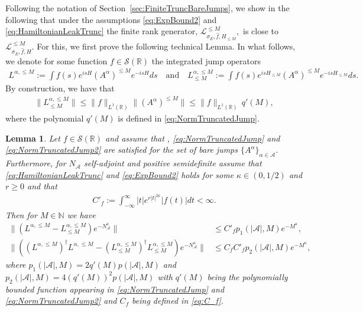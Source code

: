 \documentclass[11pt]{amsart}
\newcommand{\1}{\mathbbm{1}}
\newcommand{\N}{\mathbb{N}}
\newcommand{\cL}{\mathcal{L}}
\newcommand{\NA}{N_{\mathcal{A}}}
\newcommand{\cA}{\mathcal{A}}
\newcommand{\bin}[1]{}
\theoremstyle{plain}
\newtheorem{lemma}[theorem]{Lemma}
\theoremstyle{definition}
\theoremstyle{remark}
\numberwithin{equation}{section}
\begin{document}
\bin{In Section~\ref{sec:FiniteTruncBareJumps} we introduced the finite-dimensional truncations $a^{\le M}_i$ and $\left(a_i^{\le M}\right)^\dagger$ of the bare jumps $a$ and $a^\dagger$ and the generator $\mathcal{L}^{\le M}_{\sigma_E,\widehat{f},H}$ where we replaced the bare jumps in terms of the usual annihilation and creation operators in $\cL_{\sigma_E}$ with their finite-dimensional truncations.} 

Following the notation of Section~\ref{sec:FiniteTruncBareJumps}, we show in the following that under the assumptions \eqref{eq:ExpBound2} and \eqref{eq:HamiltonianLeakTrunc} the finite rank generator, $\mathcal{L}^{\le M}_{\sigma_E,\widehat{f},H_{\le M}},$ is close to $\mathcal{L}^{\le M}_{\sigma_E,\widehat{f},H}.$
For this, we first prove the following technical Lemma. In what follows, we denote for some function $f\in\mathcal{S}(\mathbb{R})$ the integrated jump operators 
\begin{align}
\label{eq:TruncatedL}
L^{\alpha,\le M}:=\int f(s)e^{isH}(A^{\alpha})^{\le M}e^{-isH}ds\quad\text{and}\quad
L^{\alpha,\le M}_{\le M}:=\int f(s)e^{isH_{\le M}}(A^{\alpha})^{\le M} e^{-isH_{\le M}}ds.
\end{align}
By construction, we have that
\begin{align}\label{eqLalphaMMbound}
\|L^{\alpha,\le M}_{\le M}\|\le \|f\|_{L^1(\mathbb{R})}\|(A^\alpha)^{\le M}\|\le \|f\|_{L^1(\mathbb{R})}\, q'(M),
\end{align}
where the polynomial $q'(M)$ is defined in \eqref{eq:NormTruncatedJump}.



\begin{lemma}\label{lem:integralrepapproxFullyFinite}
Let $f\in\mathcal{S}(\mathbb{R})$ and assume that , \eqref{eq:NormTruncatedJump} and \eqref{eq:NormTruncatedJump2} are satisfied for the set of bare jumps $\{A^\alpha\}_{\alpha\in\cA}$. Furthermore, for $\NA$ self-adjoint and positive semidefinite assume that \eqref{eq:HamiltonianLeakTrunc} and  \eqref{eq:ExpBound2} holds for some $\kappa\in(0,1/2)$ and $r\ge0$ and that
\begin{align*}
    C'_f := \int_{-\infty}^{\infty} |t|e^{r|t|^{2\kappa}} |f(t)|dt < \infty.
\end{align*}
Then for $M\in \N$ we have
\begin{align*}
\|(L^{\alpha,\le M}\!-\!L^{\alpha,\le M}_{\le M})e^{-\NA^{\kappa}}\|\!&\le\! C'_fp_1(|\cA|,M)e^{-M^{\kappa}},\\
\|((L^{\alpha,\le M})^\dagger L^{\alpha,\le M}-\left(L^{\alpha,\le M}_{\le M}\right)^\dagger L^{\alpha,\le M}_{\le M})e^{-\NA^{\kappa}}\|&\le C_fC'_fp_2(|\cA|,M)e^{-M^{\kappa}},\, 
\end{align*}
where $p_1(|\cA|,M)=2q'(M)p(|\cA|,M)$ and $p_2(|\cA|,M) =4(q'(M))^2p(|\cA|,M)$ with $q'(M)$ being the polynomially bounded function appearing in \eqref{eq:NormTruncatedJump} and \eqref{eq:NormTruncatedJump2} and $C_f$ being defined in \eqref{eq:C_f}.


\end{lemma}
\end{document}
